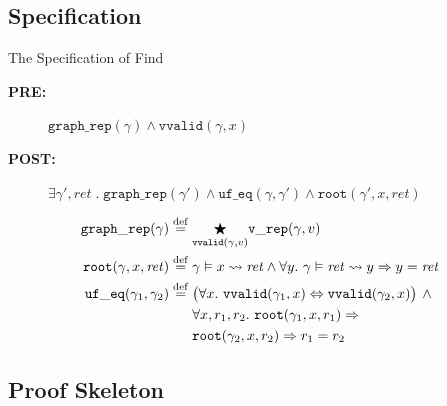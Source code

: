\documentclass[professionalfonts, xcolor=table]{beamer}
\newcommand{\defeq}{\mathbin{\overset{\mathrm{def}}{=}}}
\begin{document}
\subsection{Specification}
\begin{frame}{The Specification of Find}
  \centering
  \colorbox{lightg}{\parbox{.9\textwidth}{
      \begin{description}
      \item[{\bf PRE:}] $\mathtt{graph\_rep}(\gamma) \wedge \mathtt{vvalid}(\gamma, x)$
      \item[{\bf POST:}] $\exists \gamma', \mathit{ret}\;\text{.}\;\mathtt{graph\_rep}(\gamma')\wedge\mathtt{uf\_eq}(\gamma, \gamma') \wedge \mathtt{root}(\gamma', x, \mathit{ret})$
  \end{description}}}
  \pause
  \vskip10pt
  \colorbox{lightg}{\parbox{.9\textwidth}{
      \begin{align*}
        \mathtt{graph\_rep}(\gamma)\;\defeq\; &
        \underset{\mathtt{vvalid}(\gamma, v)}{\bigstar}\mathtt{v\_rep}(\gamma, v)\\
        \mathtt{root}(\gamma, x, \mathit{ret}) \;\defeq\; &\gamma \vDash x \leadsto \mathit{ret} \wedge
        \forall y.~ \gamma \vDash \mathit{ret} \leadsto y \Rightarrow y = \mathit{ret}\\
        \mathtt{uf\_eq}(\gamma_1, \gamma_2)\; \defeq\; &\big(\forall x.~
        \mathtt{vvalid}(\gamma_1, x)\Leftrightarrow \mathtt{vvalid}(\gamma_2,x)\big)
        \, \wedge\, \null\\
        & \forall x, r_1, r_2.~ \mathtt{root}(\gamma_1, x, r_1) \Rightarrow\\
        &\mathtt{root}(\gamma_2, x, r_2) \Rightarrow r_1 = r_2
      \end{align*}
    }}
\end{frame}

\subsection{Proof Skeleton}
\end{document}
